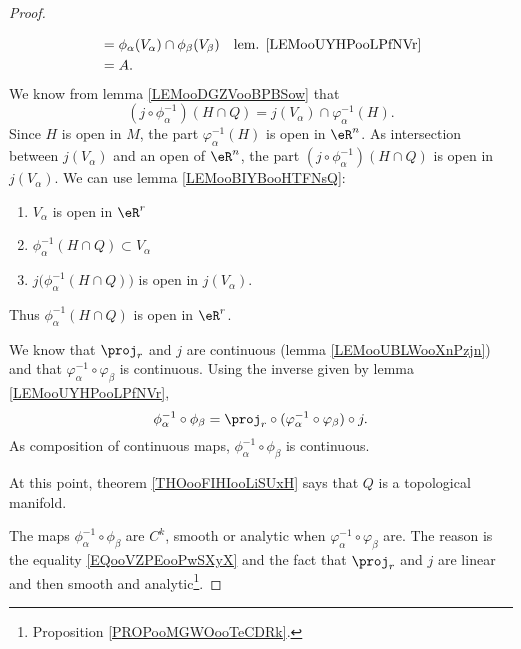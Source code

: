 \begin{proof}
\begin{subproof}
\begin{subproof}
\begin{subequations}
\begin{align}
					        & =\phi_{\alpha}(V_{\alpha})\cap\phi_{\beta}(V_{\beta})                                                  & \text{lem. \ref{LEMooUYHPooLPfNVr}} \\
					        & =A.
				\end{align}
			\end{subequations}
			We know from lemma \ref{LEMooDGZVooBPBSow} that
			\begin{equation}
				(j\circ\phi_{\alpha}^{-1})(H\cap Q)=j(V_{\alpha})\cap\varphi_{\alpha}^{-1}(H).
			\end{equation}
			Since \( H\) is open in \( M\), the part \( \varphi_{\alpha}^{-1}(H)\) is open in \( \eR^n\). As intersection between \( j(V_{\alpha})\) and an open of \( \eR^n\), the part \( (j\circ\phi_{\alpha}^{-1})(H\cap Q)\) is open in \( j(V_{\alpha})\). We can use lemma \ref{LEMooBIYBooHTFNsQ}:
			\begin{enumerate}
				\item
				      \( V_{\alpha}\) is open in \( \eR^r\)
				\item
				      \( \phi_{\alpha}^{-1}(H\cap Q)\subset V_{\alpha}\)
				\item
				      \( j\big( \phi_{\alpha}^{-1}(H\cap Q) \big)\) is open in \( j(V_{\alpha})\).
			\end{enumerate}
			Thus \( \phi_{\alpha}^{-1}(H\cap Q)\) is open in \( \eR^r\).
		\end{subproof}

		We know that \( \proj_r\) and \( j\) are continuous (lemma \ref{LEMooUBLWooXnPzjn}) and that \(\varphi_{\alpha}^{-1}\circ\varphi_{\beta}\) is continuous. Using the inverse given by lemma \ref{LEMooUYHPooLPfNVr},
		\begin{equation}		\label{EQooVZPEooPwSXyX}
			\phi_{\alpha}^{-1}\circ\phi_{\beta}=\proj_r\circ(\varphi_{\alpha}^{-1}\circ\varphi_{\beta})\circ j.
		\end{equation}
		As composition of continuous maps, \( \phi_{\alpha}^{-1}\circ\phi_{\beta}\) is continuous.
	\end{subproof}
	At this point, theorem \ref{THOooFIHIooLiSUxH} says that \( Q\) is a topological manifold.

	The maps \( \phi_{\alpha}^{-1}\circ\phi_{\beta}\) are \( C^k\), smooth or analytic when \( \varphi_{\alpha}^{-1}\circ\varphi_{\beta}\) are. The reason is the equality \eqref{EQooVZPEooPwSXyX} and the fact that \( \proj_r\) and \( j\) are linear and then smooth and analytic\footnote{Proposition \ref{PROPooMGWOooTeCDRk}.}.
\end{proof}

